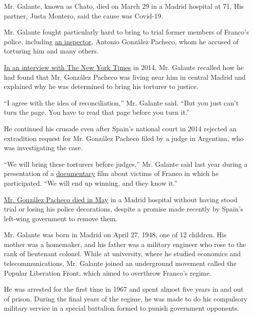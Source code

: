 Mr. Galante, known as Chato, died on March 29 in a Madrid hospital at
71. His partner, Justa Montero, said the cause was Covid-19.

Mr. Galante fought particularly hard to bring to trial former members of
Franco's police, including
\href{https://www.nytimes.com/2020/05/15/obituaries/antonio-gonzalez-pacheco-accused-policeman-in-francos-spain-dies-at-73.html}{an
inspector}, Antonio González Pacheco, whom he accused of torturing him
and many others.

\href{https://www.nytimes.com/2014/04/07/world/europe/facing-his-torturer-as-spain-confronts-its-past.html}{In
an interview with The New York Times} in 2014, Mr. Galante recalled how
he had found that Mr. González Pacheco was living near him in central
Madrid and explained why he was determined to bring his torturer to
justice.

``I agree with the idea of reconciliation,'' Mr. Galante said. ``But you
just can't turn the page. You have to read that page before you turn
it.''

He continued his crusade even after Spain's national court in 2014
rejected an extradition request for Mr. González Pacheco filed by a
judge in Argentina, who was investigating the case.

``We will bring these torturers before judges,'' Mr. Galante said last
year during a presentation of a
\href{https://thesilenceofothers.com/}{documentary} film about victims
of Franco in which he participated. ``We will end up winning, and they
know it.''

\href{https://www.nytimes.com/2020/05/15/obituaries/antonio-gonzalez-pacheco-accused-policeman-in-francos-spain-dies-at-73.html}{Mr.
González Pacheco died in May} in a Madrid hospital without having stood
trial or losing his police decorations, despite a promise made recently
by Spain's left-wing government to remove them.

Mr. Galante was born in Madrid on April 27, 1948, one of 12 children.
His mother was a homemaker, and his father was a military engineer who
rose to the rank of lieutenant colonel. While at university, where he
studied economics and telecommunications, Mr. Galante joined an
underground movement called the Popular Liberation Front, which aimed to
overthrow Franco's regime.

He was arrested for the first time in 1967 and spent almost five years
in and out of prison. During the final years of the regime, he was made
to do his compulsory military service in a special battalion formed to
punish government opponents.

